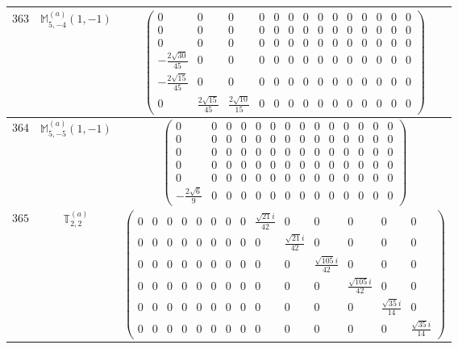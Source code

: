 \documentclass[fleqn,8pt,landscape]{jsarticle}
\begin{document}
\begin{center}
\begin{longtable}{ccc}
$ 363 $ & $ \mathbb{M}_{5,-4}^{(a)}(1,-1) $ & $ \begin{pmatrix} 0 & 0 & 0 & 0 & 0 & 0 & 0 & 0 & 0 & 0 & 0 & 0 & 0 & 0 \\ 0 & 0 & 0 & 0 & 0 & 0 & 0 & 0 & 0 & 0 & 0 & 0 & 0 & 0 \\ 0 & 0 & 0 & 0 & 0 & 0 & 0 & 0 & 0 & 0 & 0 & 0 & 0 & 0 \\ - \frac{2 \sqrt{30}}{45} & 0 & 0 & 0 & 0 & 0 & 0 & 0 & 0 & 0 & 0 & 0 & 0 & 0 \\ - \frac{2 \sqrt{15}}{45} & 0 & 0 & 0 & 0 & 0 & 0 & 0 & 0 & 0 & 0 & 0 & 0 & 0 \\ 0 & \frac{2 \sqrt{15}}{45} & \frac{2 \sqrt{10}}{15} & 0 & 0 & 0 & 0 & 0 & 0 & 0 & 0 & 0 & 0 & 0 \end{pmatrix} $ \\ \hline
$ 364 $ & $ \mathbb{M}_{5,-5}^{(a)}(1,-1) $ & $ \begin{pmatrix} 0 & 0 & 0 & 0 & 0 & 0 & 0 & 0 & 0 & 0 & 0 & 0 & 0 & 0 \\ 0 & 0 & 0 & 0 & 0 & 0 & 0 & 0 & 0 & 0 & 0 & 0 & 0 & 0 \\ 0 & 0 & 0 & 0 & 0 & 0 & 0 & 0 & 0 & 0 & 0 & 0 & 0 & 0 \\ 0 & 0 & 0 & 0 & 0 & 0 & 0 & 0 & 0 & 0 & 0 & 0 & 0 & 0 \\ 0 & 0 & 0 & 0 & 0 & 0 & 0 & 0 & 0 & 0 & 0 & 0 & 0 & 0 \\ - \frac{2 \sqrt{6}}{9} & 0 & 0 & 0 & 0 & 0 & 0 & 0 & 0 & 0 & 0 & 0 & 0 & 0 \end{pmatrix} $ \\ \hline
$ 365 $ & $ \mathbb{T}_{2,2}^{(a)} $ & $ \begin{pmatrix} 0 & 0 & 0 & 0 & 0 & 0 & 0 & 0 & \frac{\sqrt{21} i}{42} & 0 & 0 & 0 & 0 & 0 \\ 0 & 0 & 0 & 0 & 0 & 0 & 0 & 0 & 0 & \frac{\sqrt{21} i}{42} & 0 & 0 & 0 & 0 \\ 0 & 0 & 0 & 0 & 0 & 0 & 0 & 0 & 0 & 0 & \frac{\sqrt{105} i}{42} & 0 & 0 & 0 \\ 0 & 0 & 0 & 0 & 0 & 0 & 0 & 0 & 0 & 0 & 0 & \frac{\sqrt{105} i}{42} & 0 & 0 \\ 0 & 0 & 0 & 0 & 0 & 0 & 0 & 0 & 0 & 0 & 0 & 0 & \frac{\sqrt{35} i}{14} & 0 \\ 0 & 0 & 0 & 0 & 0 & 0 & 0 & 0 & 0 & 0 & 0 & 0 & 0 & \frac{\sqrt{35} i}{14} \end{pmatrix} $ \\ \hline

\end{longtable}
\end{center}
\end{document}
